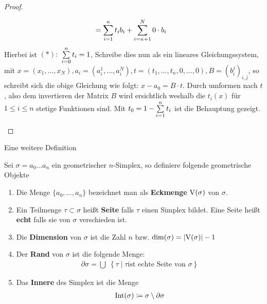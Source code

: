\begin{Lem}
\begin{proof}
\begin{description}
\begin{align*}
                &= \sp{1}{n} t_i b_i + \sp{n+1}{N} 0 \cdot b_i
      \end{align*}
      Hierbei ist $(*):$ $\sp{0}{n} t_i = 1$, Schreibe dies nun als
      ein lineares Gleichungssystem, mit
      $x=(x_1,\ldots,x_N),a_i=(a_i^1,\ldots,a_i^N),t=(t_1,\ldots,t_n,0,\ldots,0),B=(b_i^j)_{i,j}$,
      so schreibt sich die obige Gleichung wie folgt:
      $x-a_0 = B\cdot t$. Durch umformen nach $t$, also dem
      invertieren der Matrix $B$ wird ersichtlich weshalb die $t_i(x)$
      für $1 \leq i \leq n$ stetige Funktionen sind. Mit
      $t_0 = 1 - \sp{1}{n} t_i$ ist die Behauptung gezeigt.
    \end{description}
  \end{proof}
\end{Lem}

Eine weitere Definition

\begin{Def}
  Sei $\sigma = a_0 \ldots a_n$ ein geometrischer $n$-Simplex, so
  definiere folgende geometrische Objekte
  \begin{enumerate}[\textbullet]%
  \item Die Menge $\{ a_0 , \ldots , a_n \}$ bezeichnet man als
    \textbf{Eckmenge} $\V(\sigma)$ von $\sigma$.
  \item Ein Teilmenge $\tau \subset \sigma$ heißt \textbf{Seite} falls
	  $\tau$ einen Simplex bildet. Eine Seite heißt \textbf{echt} falls sie von 
		$\sigma$ verschieden ist.
	\item Die \textbf{Dimension} von $\sigma$ ist die Zahl $n$ bzw. 
		$\dim(\sigma) = \gr{\V(\sigma)} - 1$
  \item Der \textbf{Rand} von $\sigma$ ist die folgende Menge:
    \begin{gather*}
      \partial\sigma = \bigcup \; \left\{ \tau \; \Big| \; \tau \text{
          ist echte Seite von } \sigma \right\}
    \end{gather*}
  \item Das \textbf{Innere} des Simplex ist die Menge
    \begin{gather*}
    	\Int(\sigma) \coloneqq \sigma \setminus \partial\sigma
    \end{gather*}
  \end{enumerate}
\end{Def}

